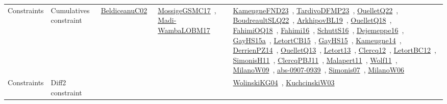 {\begin{longtable}{lp{3cm}>{\raggedright\arraybackslash}p{6cm}>{\raggedright\arraybackslash}p{6cm}>{\raggedright\arraybackslash}p{8cm}}
Constraints & Cumulatives constraint & \href{../works/BeldiceanuC02.pdf}{BeldiceanuC02}~\cite{BeldiceanuC02} & \href{../works/MossigeGSMC17.pdf}{MossigeGSMC17}~\cite{MossigeGSMC17}, \href{../works/Madi-WambaLOBM17.pdf}{Madi-WambaLOBM17}~\cite{Madi-WambaLOBM17} & \href{../works/KameugneFND23.pdf}{KameugneFND23}~\cite{KameugneFND23}, \href{../works/TardivoDFMP23.pdf}{TardivoDFMP23}~\cite{TardivoDFMP23}, \href{../works/OuelletQ22.pdf}{OuelletQ22}~\cite{OuelletQ22}, \href{../works/BoudreaultSLQ22.pdf}{BoudreaultSLQ22}~\cite{BoudreaultSLQ22}, \href{../works/ArkhipovBL19.pdf}{ArkhipovBL19}~\cite{ArkhipovBL19}, \href{../works/OuelletQ18.pdf}{OuelletQ18}~\cite{OuelletQ18}, \href{../works/FahimiOQ18.pdf}{FahimiOQ18}~\cite{FahimiOQ18}, \href{../works/Fahimi16.pdf}{Fahimi16}~\cite{Fahimi16}, \href{../works/SchuttS16.pdf}{SchuttS16}~\cite{SchuttS16}, \href{../works/Dejemeppe16.pdf}{Dejemeppe16}~\cite{Dejemeppe16}, \href{../works/GayHS15a.pdf}{GayHS15a}~\cite{GayHS15a}, \href{../works/LetortCB15.pdf}{LetortCB15}~\cite{LetortCB15}, \href{../works/GayHS15.pdf}{GayHS15}~\cite{GayHS15}, \href{../works/Kameugne14.pdf}{Kameugne14}~\cite{Kameugne14}, \href{../works/DerrienPZ14.pdf}{DerrienPZ14}~\cite{DerrienPZ14}, \href{../works/OuelletQ13.pdf}{OuelletQ13}~\cite{OuelletQ13}, \href{../works/Letort13.pdf}{Letort13}~\cite{Letort13}, \href{../works/Clercq12.pdf}{Clercq12}~\cite{Clercq12}, \href{../works/LetortBC12.pdf}{LetortBC12}~\cite{LetortBC12}, \href{../works/SimonisH11.pdf}{SimonisH11}~\cite{SimonisH11}, \href{../works/ClercqPBJ11.pdf}{ClercqPBJ11}~\cite{ClercqPBJ11}, \href{../works/Malapert11.pdf}{Malapert11}~\cite{Malapert11}, \href{../works/Wolf11.pdf}{Wolf11}~\cite{Wolf11}, \href{../works/MilanoW09.pdf}{MilanoW09}~\cite{MilanoW09}, \href{../works/abs-0907-0939.pdf}{abs-0907-0939}~\cite{abs-0907-0939}, \href{../works/Simonis07.pdf}{Simonis07}~\cite{Simonis07}, \href{../works/MilanoW06.pdf}{MilanoW06}~\cite{MilanoW06}\\
Constraints & Diff2 constraint &  &  & \href{../works/WolinskiKG04.pdf}{WolinskiKG04}~\cite{WolinskiKG04}, \href{../works/KuchcinskiW03.pdf}{KuchcinskiW03}~\cite{KuchcinskiW03}\\

\end{longtable}}
